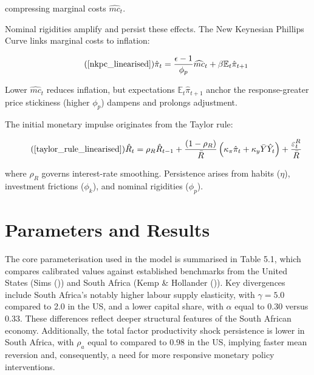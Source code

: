 \documentclass[11pt,preprint]{elsarticle}
\numberwithin{equation}{section}
\numberwithin{figure}{section}
\numberwithin{table}{section}
\begin{document}
compressing marginal costs \(\widehat{mc}_t\).

Nominal rigidities amplify and persist these effects. The New Keynesian
Phillips Curve links marginal costs to inflation:

\begin{equation}\tag{\ref{nkpc_linearised}}
\hat{\pi}_t = \frac{\epsilon-1}{\phi_p} \widehat{mc}_t + \beta \mathbb{E}_t \hat{\pi}_{t+1}
\end{equation}

Lower \(\widehat{mc}_t\) reduces inflation, but expectations
\(\mathbb{E}_t \hat{\pi}_{t+1}\) anchor the response-greater price
stickiness (higher \(\phi_p\)) dampens and prolongs adjustment.

The initial monetary impulse originates from the Taylor rule:

\begin{equation}\tag{\ref{taylor_rule_linearised}}
\hat{R}_t = \rho_R \hat{R}_{t-1} + \frac{(1 - \rho_R)}{\bar{R}} \left( \kappa_\pi \hat{\pi}_t + \kappa_y \bar{Y} \hat{Y}_t \right) + \frac{\varepsilon_t^R}{\bar{R}}
\end{equation}

where \(\rho_R\) governs interest-rate smoothing. Persistence arises
from habits (\(\eta\)), investment frictions (\(\phi_k\)), and nominal
rigidities (\(\phi_p\)).

\section{Parameters and Results}\label{parameters-and-results}

The core parameterisation used in the model is summarised in Table 5.1,
which compares calibrated values against established benchmarks from the
United States (Sims ()) and
South Africa (Kemp \& Hollander ()).
Key divergences include South Africa's notably higher labour supply
elasticity, with \(\gamma = 5.0\) compared to 2.0 in the US, and a lower
capital share, with \(\alpha\) equal to 0.30 versus 0.33. These
differences reflect deeper structural features of the South African
economy. Additionally, the total factor productivity shock persistence
is lower in South Africa, with \(\rho_a\) equal to compared to 0.98 in
the US, implying faster mean reversion and, consequently, a need for
more responsive monetary policy interventions.
\end{document}
